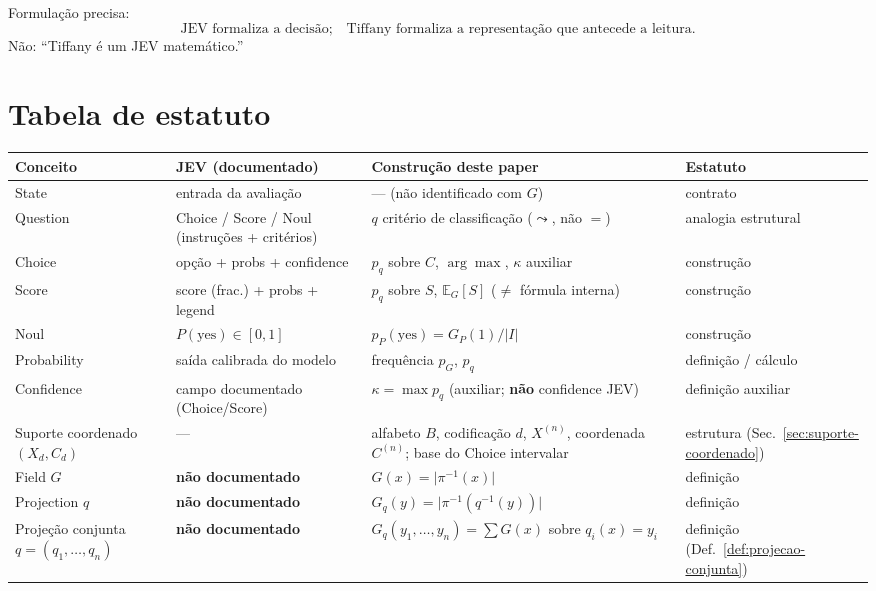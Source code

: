 \documentclass[11pt,a4paper]{article}
\begin{document}
Formulação precisa:
\[
\boxed{\text{JEV formaliza a decisão;}\quad
\text{Tiffany formaliza a representação que antecede a leitura.}}
\]
Não:
``Tiffany é um JEV matemático.''

\section{Tabela de estatuto}

\begin{center}
\small
\begin{tabular}{@{}p{}p{}p{}p{}@{}}
\toprule
Conceito & JEV (documentado) & Construção deste paper & Estatuto \\
\midrule
State & entrada da avaliação & --- (não identificado com \(G\)) & contrato \\
Question & Choice / Score / Noul (instruções + critérios) & \(q\) critério de classificação (\(\leadsto\), não \(=\)) & analogia estrutural \\
Choice & opção + probs + confidence & \(p_q\) sobre \(C\), \(\arg\max\), \(\kappa\) auxiliar & construção \\
Score & score (frac.) + probs + legend & \(p_q\) sobre \(S\), \(\mathbb E_G[S]\) (\(\neq\) fórmula interna) & construção \\
Noul & \(P(\mathrm{yes})\in[0,1]\) & \(p_P(\mathrm{yes})=G_P(1)/\lvert I\rvert\) & construção \\
Probability & saída calibrada do modelo & frequência \(p_G\), \(p_q\) & definição / cálculo \\
Confidence & campo documentado (Choice/Score) & \(\kappa=\max p_q\) (auxiliar; \textbf{não} confidence JEV) & definição auxiliar \\
Suporte coordenado \((X_d,C_d)\) & --- & alfabeto \(B\), codificação \(d\), \(X^{(n)}\), coordenada \(C^{(n)}\); base do Choice intervalar & estrutura (Sec.~\ref{sec:suporte-coordenado}) \\
Field \(G\) & \textbf{não documentado} & \(G(x)=\lvert\pi^{-1}(x)\rvert\) & definição \\
Projection \(q\) & \textbf{não documentado} & \(G_q(y)=\lvert\pi^{-1}(q^{-1}(y))\rvert\) & definição \\
Projeção conjunta \(q=(q_1,\dots,q_n)\) & \textbf{não documentado} & \(G_q(y_1,\dots,y_n)=\sum G(x)\) sobre \(q_i(x){=}y_i\) & definição (Def.~\ref{def:projecao-conjunta}) \\

\end{tabular}
\end{center}
\end{document}

